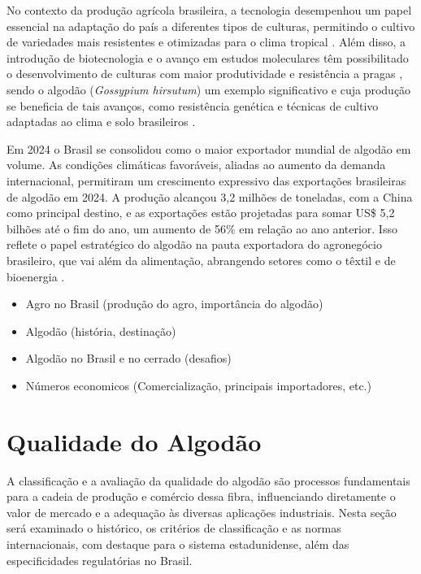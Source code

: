 No contexto da produção agrícola brasileira, a tecnologia desempenhou um papel essencial na adaptação do país a diferentes 
tipos de culturas, permitindo o cultivo de variedades mais resistentes e otimizadas para o clima tropical \cite{basso2024agriculture}. 
Além disso, a introdução de biotecnologia e o avanço em estudos moleculares têm possibilitado o desenvolvimento de culturas com maior 
produtividade e resistência a pragas \cite{das2023biotech}, sendo o algodão (\textit{Gossypium hirsutum}) um exemplo significativo e cuja produção 
se beneficia de tais avanços, como resistência genética e técnicas de cultivo adaptadas ao clima e solo brasileiros \cite{ribeiro2017cottontrans, ribeiro2019cottontrans, ribeiro2023cottontrans}.

Em 2024 o Brasil se consolidou como o maior exportador mundial de algodão em volume. As condições climáticas favoráveis, aliadas ao aumento da 
demanda internacional, permitiram um crescimento expressivo das exportações brasileiras de algodão em 2024. 
A produção alcançou 3,2 milhões de toneladas, com a China como principal destino, e as exportações estão projetadas para somar US\$ 5,2 bilhões 
até o fim do ano, um aumento de 56\% em relação ao ano anterior. Isso reflete o papel estratégico do algodão na pauta exportadora do agronegócio 
brasileiro, que vai além da alimentação, abrangendo setores como o têxtil e de bioenergia \cite{cardoso2024perspectivas}.

\begin{itemize}
	\item Agro no Brasil (produção do agro, importância do algodão)
	\item Algodão (história, destinação)
	\item Algodão no Brasil e no cerrado (desafios)
	\item Números economicos (Comercialização, principais importadores, etc.)
\end{itemize}

\section{Qualidade do Algodão}\label{rev_qualidade_algodao}

A classificação e a avaliação da qualidade do algodão são processos fundamentais para a cadeia de produção e comércio dessa fibra, influenciando diretamente o valor de mercado e a adequação às diversas aplicações industriais. Nesta seção será examinado o histórico, os critérios de classificação e as normas internacionais, com destaque para o sistema estadunidense, além das especificidades regulatórias no Brasil.

